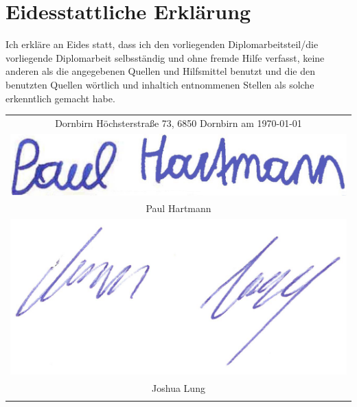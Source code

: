 \section*{Eidesstattliche Erklärung}

Ich erkläre an Eides statt, dass ich den vorliegenden Diplomarbeitsteil/die vorliegende Diplomarbeit selbsständig und ohne fremde Hilfe verfasst, keine anderen als die angegebenen Quellen und Hilfsmittel benutzt und die den benutzten Quellen wörtlich und inhaltich entnommenen Stellen als solche erkenntlich gemacht habe.

\bigskip

\begin{table}[H]
  \centering
  \begin{tabular}{c}
    Dornbirn Höchsterstraße 73, 6850 Dornbirn am \today                \\
    \begin{minipage}[c][14ex]{0.25\textwidth}
      \includegraphics[width=1\textwidth]{images/Unterschrift_Paul.png}
    \end{minipage}   \\

    \hline
    Paul Hartmann                                                      \\
    \begin{minipage}[c][13ex]{0.25\textwidth}
      \includegraphics[width=1\textwidth]{images/Unterschrift_Joshua.png}
    \end{minipage} \\

    \hline
    Joshua Lung                                                        \\
    \\ [10ex]
  \end{tabular}
\end{table}